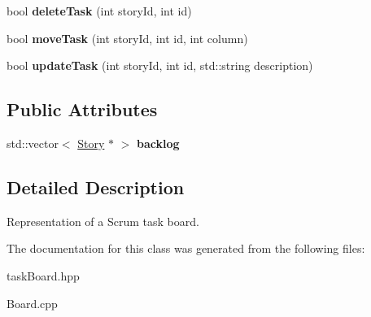 \begin{DoxyCompactItemize}
\item 
\hypertarget{classBoard_a61e7a41cc970d49fcee032906231f6fa}{bool {\bfseries delete\-Task} (int story\-Id, int id)}\label{classBoard_a61e7a41cc970d49fcee032906231f6fa}

\item 
\hypertarget{classBoard_aae346107b343fd53653ee6a4e302474b}{bool {\bfseries move\-Task} (int story\-Id, int id, int column)}\label{classBoard_aae346107b343fd53653ee6a4e302474b}

\item 
\hypertarget{classBoard_af25b1a2cfef182fea1a8d578af0eef5e}{bool {\bfseries update\-Task} (int story\-Id, int id, std\-::string description)}\label{classBoard_af25b1a2cfef182fea1a8d578af0eef5e}

\end{DoxyCompactItemize}
\subsection*{Public Attributes}
\begin{DoxyCompactItemize}
\item 
\hypertarget{classBoard_adb81609ae4130f5668d332c202c6569b}{std\-::vector$<$ \hyperlink{classStory}{Story} $\ast$ $>$ {\bfseries backlog}}\label{classBoard_adb81609ae4130f5668d332c202c6569b}

\end{DoxyCompactItemize}


\subsection{Detailed Description}
Representation of a Scrum task board. 

The documentation for this class was generated from the following files\-:\begin{DoxyCompactItemize}
\item 
task\-Board.\-hpp\item 
Board.\-cpp\end{DoxyCompactItemize}
